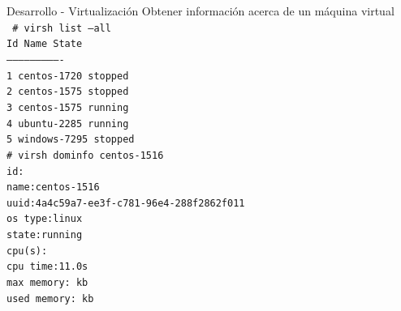 \begin{frame}{Desarrollo - Virtualización}
    \vspace{-1cm} {Obtener información acerca de un máquina virtual}
    \\
    \vspace{0.5cm}
    \begingroup
    \fontsize{8pt}{8pt}\selectfont
        \texttt{
            \# virsh list --all \\
             Id\hspace{0.15cm}  Name\hspace{1.5cm} State \\
            ---------------------------- \\
             1\hspace{0.15cm}   centos-1720\hspace{0.5cm}   stopped \\
             2\hspace{0.15cm}   centos-1575\hspace{0.5cm}   stopped \\
             3\hspace{0.15cm}   centos-1575\hspace{0.5cm}   running \\
             4\hspace{0.15cm}   ubuntu-2285\hspace{0.5cm}   running \\
             5\hspace{0.15cm}   windows-7295\hspace{0.38cm}  stopped \\
            \vspace{0.5cm}
             \# virsh dominfo  centos-1516  \\
             id: \\
             name:\quad centos-1516  \\
             uuid:\quad  4a4c59a7-ee3f-c781-96e4-288f2862f011 \\
             os type:\quad linux \\
             state:\quad running  \\
             cpu(s):  \\
             cpu time:\quad  11.0s \\ 
             max memory: kb  \\
             used memory: kb  \\
        }    
    \endgroup    
\end{frame}

